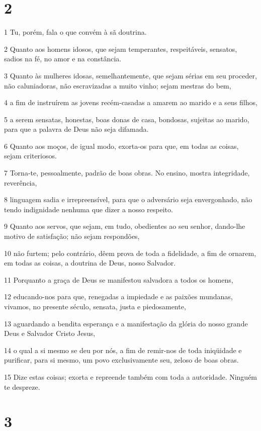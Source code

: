 \chapter{2}

\par 1 Tu, porém, fala o que convém à sã doutrina.
\par 2 Quanto aos homens idosos, que sejam temperantes, respeitáveis, sensatos, sadios na fé, no amor e na constância.
\par 3 Quanto às mulheres idosas, semelhantemente, que sejam sérias em seu proceder, não caluniadoras, não escravizadas a muito vinho; sejam mestras do bem,
\par 4 a fim de instruírem as jovens recém-casadas a amarem ao marido e a seus filhos,
\par 5 a serem sensatas, honestas, boas donas de casa, bondosas, sujeitas ao marido, para que a palavra de Deus não seja difamada.
\par 6 Quanto aos moços, de igual modo, exorta-os para que, em todas as coisas, sejam criteriosos.
\par 7 Torna-te, pessoalmente, padrão de boas obras. No ensino, mostra integridade, reverência,
\par 8 linguagem sadia e irrepreensível, para que o adversário seja envergonhado, não tendo indignidade nenhuma que dizer a nosso respeito.
\par 9 Quanto aos servos, que sejam, em tudo, obedientes ao seu senhor, dando-lhe motivo de satisfação; não sejam respondões,
\par 10 não furtem; pelo contrário, dêem prova de toda a fidelidade, a fim de ornarem, em todas as coisas, a doutrina de Deus, nosso Salvador.
\par 11 Porquanto a graça de Deus se manifestou salvadora a todos os homens,
\par 12 educando-nos para que, renegadas a impiedade e as paixões mundanas, vivamos, no presente século, sensata, justa e piedosamente,
\par 13 aguardando a bendita esperança e a manifestação da glória do nosso grande Deus e Salvador Cristo Jesus,
\par 14 o qual a si mesmo se deu por nós, a fim de remir-nos de toda iniqüidade e purificar, para si mesmo, um povo exclusivamente seu, zeloso de boas obras.
\par 15 Dize estas coisas; exorta e repreende também com toda a autoridade. Ninguém te despreze.

\chapter{3}


